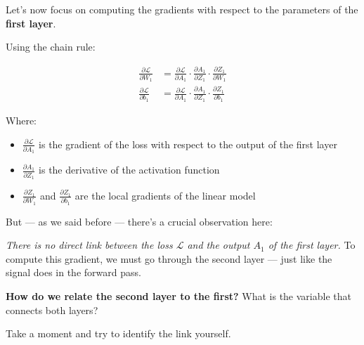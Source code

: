 \documentclass[11pt]{article}
\begin{document}
\section*{}

Let’s now focus on computing the gradients with respect to the parameters of the \textbf{first layer}.

Using the chain rule:

\[
\begin{aligned}
\frac{\partial \mathcal{L}}{\partial W_1} &= 
\frac{\partial \mathcal{L}}{\partial A_1} \cdot 
\frac{\partial A_1}{\partial Z_1} \cdot 
\frac{\partial Z_1}{\partial W_1} \\[1em]
\frac{\partial \mathcal{L}}{\partial b_1} &= 
\frac{\partial \mathcal{L}}{\partial A_1} \cdot 
\frac{\partial A_1}{\partial Z_1} \cdot 
\frac{\partial Z_1}{\partial b_1}
\end{aligned}
\]

Where:
\begin{itemize}
    \item $\frac{\partial \mathcal{L}}{\partial A_1}$ is the gradient of the loss with respect to the output of the first layer
    \item $\frac{\partial A_1}{\partial Z_1}$ is the derivative of the activation function
    \item $\frac{\partial Z_1}{\partial W_1}$ and $\frac{\partial Z_1}{\partial b_1}$ are the local gradients of the linear model
\end{itemize}

But — as we said before — there's a crucial observation here:

\vspace{0.5em}
\textit{There is no direct link between the loss $\mathcal{L}$ and the output $A_1$ of the first layer.}  
To compute this gradient, we must go through the second layer — just like the signal does in the forward pass.

\vspace{1em}

\begin{tcolorbox}[colback=yellow!5, colframe=yellow!50!black, title=Pause and Think]
\textbf{How do we relate the second layer to the first?}  
What is the variable that connects both layers?

Take a moment and try to identify the link yourself.
\end{tcolorbox}

\vspace{1em}
\end{document}
